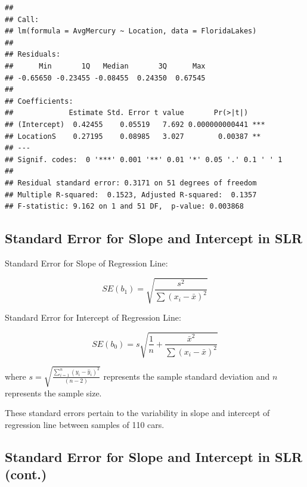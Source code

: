 \documentclass[]{book}
\newenvironment{Shaded}{\begin{snugshade}}{\end{snugshade}}
\newcommand{\KeywordTok}[1]{\textcolor[rgb]{0.13,0.29,0.53}{\textbf{#1}}}
\newcommand{\DecValTok}[1]{\textcolor[rgb]{0.00,0.00,0.81}{#1}}
\newcommand{\StringTok}[1]{\textcolor[rgb]{0.31,0.60,0.02}{#1}}
\newcommand{\OperatorTok}[1]{\textcolor[rgb]{0.81,0.36,0.00}{\textbf{#1}}}
\newcommand{\NormalTok}[1]{#1}
\begin{document}
\begin{verbatim}
## 
## Call:
## lm(formula = AvgMercury ~ Location, data = FloridaLakes)
## 
## Residuals:
##      Min       1Q   Median       3Q      Max 
## -0.65650 -0.23455 -0.08455  0.24350  0.67545 
## 
## Coefficients:
##             Estimate Std. Error t value       Pr(>|t|)    
## (Intercept)  0.42455    0.05519   7.692 0.000000000441 ***
## LocationS    0.27195    0.08985   3.027        0.00387 ** 
## ---
## Signif. codes:  0 '***' 0.001 '**' 0.01 '*' 0.05 '.' 0.1 ' ' 1
## 
## Residual standard error: 0.3171 on 51 degrees of freedom
## Multiple R-squared:  0.1523, Adjusted R-squared:  0.1357 
## F-statistic: 9.162 on 1 and 51 DF,  p-value: 0.003868
\end{verbatim}

\subsection{Standard Error for Slope and Intercept in
SLR}\label{standard-error-for-slope-and-intercept-in-slr}

Standard Error for Slope of Regression Line:

\[
SE(b_1)=\sqrt{\frac{s^2}{\sum(x_i-\bar{x})^2}} 
\]

Standard Error for Intercept of Regression Line:

\[
SE(b_0)=s\sqrt{\frac{1}{n}+\frac{\bar{x}^2}{\sum(x_i-\bar{x})^2}}
\]

where
\(s=\sqrt{\frac{\displaystyle\sum_{i=1}^n(y_i-\hat{y}_i)^2}{(n-2)}}\)
represents the sample standard deviation and \(n\) represents the sample
size.

These standard errors pertain to the variability in slope and intercept
of regression line between samples of 110 cars.

\subsection{Standard Error for Slope and Intercept in SLR
(cont.)}\label{standard-error-for-slope-and-intercept-in-slr-cont.}

\begin{Shaded}
\end{Shaded}
\end{document}
